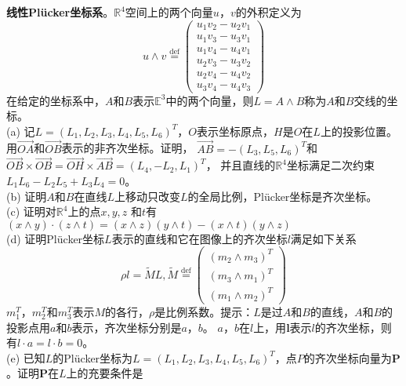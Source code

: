 \begin{problem}
    \textbf{线性Pl{\"u}cker坐标系}。$\mathbb{R}^4$空间上的两个向量$u$，$v$的外积定义为
    $$u\wedge v \overset{\text{def}}{=}\begin{pmatrix}
        u_1v_2-u_2v_1\\
        u_1v_3-u_3v_1\\
        u_1v_4-u_4v_1\\
        u_2v_3-u_3v_2\\
        u_2v_4-u_4v_2\\
        u_3v_4-u_4v_3
       \end{pmatrix} $$
    在给定的坐标系中，$A$和$B$表示$\mathbb{E}^3$中的两个向量，则$L=A\wedge B$称为$A$和$B$交线的坐标。
    \\(a) 记$L=(L_1,L_2,L_3,L_4,L_5,L_6)^T$，$O$表示坐标原点，$H$是$O$在$L$上的投影位置。用$\overrightarrow{OA} $和$\overrightarrow{OB} $表示的非齐次坐标。证明，
        $\overrightarrow{AB} = -(L_3, L_5, L_6)^T$和$\overrightarrow{OB} \times \overrightarrow{OB} =\overrightarrow{OH} \times \overrightarrow{AB} = (L_4, -L_2, L_1)^T$，
        并且直线的$\mathbb{R}^4$坐标满足二次约束$L_1L_6-L_2L_5+L_3L_4=0$。                          
    \\(b) 证明$A$和$B$在直线$L$上移动只改变$L$的全局比例，Pl{\"u}cker坐标是齐次坐标。                    
    \\(c) 证明对$\mathbb{R}^4$上的点$x,y,z$ 和$t$有                                                   
        $(x \wedge y) \cdot (z \wedge t)=(x \wedge z)(y \wedge t)-(x \wedge t)(y \wedge z)$     
    \\(d) 证明Pl{\"u}cker坐标$L$表示的直线和它在图像上的齐次坐标$l$满足如下关系
        \begin{equation}
            \rho l =\widetilde{M} L, \widetilde{M} \overset{\text{def}}{=} \begin{pmatrix}
                (m_2 \wedge m_3)^T \\
                (m_3 \wedge m_1)^T \\
                (m_1 \wedge m_2)^T
               \end{pmatrix}
        \end{equation}
        $m^T_1$，$m^T_2$和$m^T_3$表示$M$的各行，$\rho$是比例系数。提示：$L$是过$A$和$B$的直线，$A$和$B$的投影点用$a$和$b$表示，齐次坐标分别是$a$，$b$。
        $a$，$b$在$l$上，用$\mathbf{l}$表示$l$的齐次坐标，则有$l \cdot a = l \cdot b =0$。
    \\(e) 已知$L$的Pl{\"u}cker坐标为$L=(L_1,L_2,L_3,L_4,L_5,L_6)^T$，点$P$的齐次坐标向量为$\mathbf{P}$。证明$\mathbf{P}$在$L$上的充要条件是

\end{problem}
